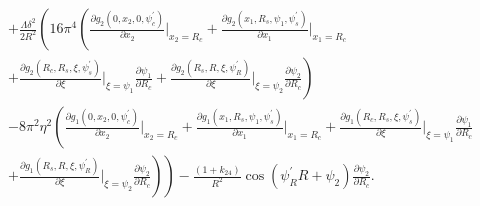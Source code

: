 \documentclass[12pt]{article}
\begin{document}
\begin{align}
&+\frac{\Lambda\delta^2}{2R^2}\left(16\pi^4\left(\frac{\partial g_2(0,x_2,0,\psi_c^{\prime})}{\partial x_2}\bigg|_{x_2=R_c}+\frac{\partial g_2(x_1,R_s,\psi_1,\psi_s^{\prime})}{\partial x_1}\bigg|_{x_1=R_c}\right.\right.\nonumber\\
&\left.+\frac{\partial g_2(R_c,R_s,\xi,\psi_s^{\prime})}{\partial\xi}\bigg|_{\xi=\psi_1}\frac{\partial\psi_1}{\partial R_c}+\frac{\partial g_2(R_s,R,\xi,\psi_R^{\prime})}{\partial\xi}\bigg|_{\xi=\psi_2}\frac{\partial\psi_2}{\partial R_c}\right)\nonumber\\
&-8\pi^2\eta^2\left(\frac{\partial g_1(0,x_2,0,\psi_c^{\prime})}{\partial x_2}\bigg|_{x_2=R_c}+\frac{\partial g_1(x_1,R_s,\psi_1,\psi_s^{\prime})}{\partial x_1}\bigg|_{x_1=R_c}+\frac{\partial g_1(R_c,R_s,\xi,\psi_s^{\prime})}{\partial\xi}\bigg|_{\xi=\psi_1}\frac{\partial\psi_1}{\partial R_c}\right.\nonumber\\
&\left.\left.+\frac{\partial g_1(R_s,R,\xi,\psi_R^{\prime})}{\partial\xi}\bigg|_{\xi=\psi_2}\frac{\partial\psi_2}{\partial R_c}\right)\right)-\frac{(1+k_{24})}{R^2}\cos(\psi_R^{\prime}R+\psi_2)\frac{\partial\psi_2}{\partial R_c}.\label{eq:dEdRc}
\end{align}
\end{document}
